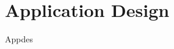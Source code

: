 \documentclass[12pt, letterpaper, twoside]{article}
\begin{document}
    \section{Application Design}
	 Appdes \\ \\ \\ \\ \\ \\ \\ \\ \\ \\ \\ \\ \\ \\ \\   \\ \\ \\ \\ \\ \\ \\ \\ \\ \\ \\ \\ \\ \\ \\ \\ \\ \\ \\ \\ \\ \\ \\   
\end{document}
